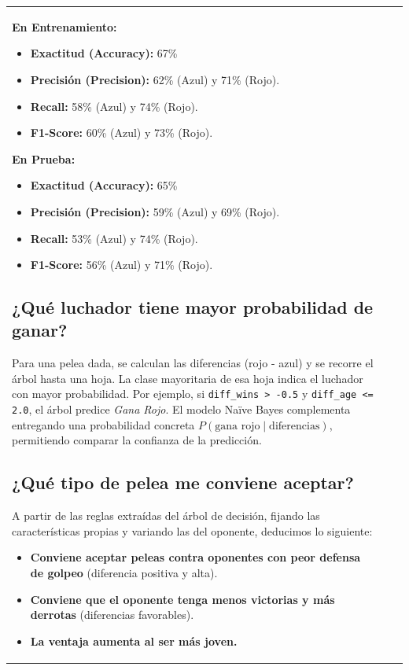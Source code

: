 \documentclass[11pt,a4paper]{article}
\begin{document}
\begin{longtable}{>{\raggedright\arraybackslash}p{5.6cm}>{\raggedright\arraybackslash}p{1.3cm}>{\raggedright\arraybackslash}p{5.1cm}}
\noindent
\textbf{En Entrenamiento:}

\begin{itemize}
    \item \textbf{Exactitud (Accuracy):} 67\%
    \item \textbf{Precisión (Precision):} 62\% (Azul) y 71\% (Rojo).
    \item \textbf{Recall:} 58\% (Azul) y 74\% (Rojo).
    \item \textbf{F1-Score:} 60\% (Azul) y 73\% (Rojo).
\end{itemize}

\noindent
\textbf{En Prueba:}
\begin{itemize}
    \item \textbf{Exactitud (Accuracy):} 65\%
    \item \textbf{Precisión (Precision):} 59\% (Azul) y 69\% (Rojo).
    \item \textbf{Recall:} 53\% (Azul) y 74\% (Rojo).
    \item \textbf{F1-Score:} 56\% (Azul) y 71\% (Rojo).
\end{itemize}



\subsection{¿Qué luchador tiene mayor probabilidad de ganar?}
Para una pelea dada, se calculan las diferencias (rojo - azul) y se recorre el árbol hasta una hoja. La clase mayoritaria de esa hoja indica el luchador con mayor probabilidad. Por ejemplo, si \texttt{diff\_wins > -0.5} y \texttt{diff\_age <= 2.0}, el árbol predice \textit{Gana Rojo}. El modelo Naïve Bayes complementa entregando una probabilidad concreta $P(\text{gana rojo} \mid \text{diferencias})$, permitiendo comparar la confianza de la predicción.

\subsection{¿Qué tipo de pelea me conviene aceptar?}

A partir de las reglas extraídas del árbol de decisión, fijando las características propias y variando las del oponente, deducimos lo siguiente:
\begin{itemize}
    \item \textbf{Conviene aceptar peleas contra oponentes con peor defensa de golpeo} (diferencia positiva y alta).
    \item \textbf{Conviene que el oponente tenga menos victorias y más derrotas} (diferencias favorables).
    \item \textbf{La ventaja aumenta al ser más joven.}
\end{itemize}


\end{longtable}
\end{document}
